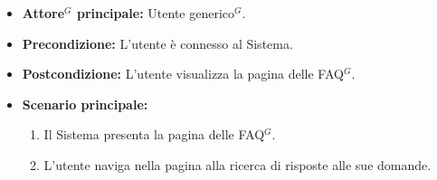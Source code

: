 
\label{usecase:Visualizzazione FAQ}
\begin{itemize}
	\item \textbf{\gls{Attore}$^G$ principale:} \gls{Utente generico}$^G$.


	\item \textbf{Precondizione:}
	      L'utente è connesso al Sistema.

	\item \textbf{Postcondizione:} L'utente visualizza la pagina delle \ac{FAQ}$^G$.

	\item \textbf{Scenario principale:}
	      \begin{enumerate}
              \item Il Sistema presenta la pagina delle \ac{FAQ}$^G$.
              \item L'utente naviga nella pagina alla ricerca di risposte alle sue domande.
		    
	      \end{enumerate}
\end{itemize}